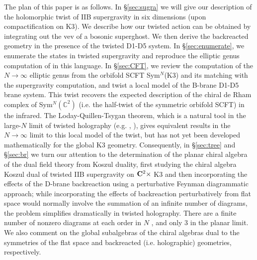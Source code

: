 \documentclass[11pt]{amsart}
\begin{document}
The plan of this paper is as follows. In \S \ref{sec:sugra} we will give our description of the holomorphic twist of IIB supergravity in six dimensions (upon compactification on K3). We describe how our twisted action can be obtained by integrating out the vev of a bosonic superghost. We then derive the backreacted geometry in the presence of the twisted D1-D5 system. In \S \ref{sec:enumerate}, we enumerate the states in twisted supergravity and reproduce the elliptic genus computation of \cite{deBoerSUGRA, deBoerEG} in this language. In \S \ref{sec:CFT}, we review the computation of the $N \rightarrow \infty$ elliptic genus from the orbifold SCFT Sym$^N$(K3) and its matching with the supergravity computation, and twist a local model of the B-brane D1-D5 brane system. This twist recovers the expected description of the chiral de Rham complex of Sym$^N(\mathbb{C}^2)$ (i.e. the half-twist of the symmetric orbifold SCFT) in the infrared. The Loday-Quillen-Tsygan theorem, which is a natural tool in the large-$N$ limit of twisted holography (e.g. \cite{Zeng:2023lox}, \cite{ginot2022large}), gives equivalent results in the $N \rightarrow \infty$ limit to this local model of the twist, but has not yet been developed mathematically for the global K3 geometry. Consequently, in \S \ref{sec:tree} and \S \ref{sec:br} we turn our attention to the determination of the planar chiral algebra of the dual field theory from Koszul duality, first studying the chiral algebra Koszul dual of twisted IIB supergravity on $\mathbf{C}^2 \times$ K3 and then incorporating the effects of the D-brane backreaction using a perturbative Feynman diagrammatic approach; while incorporating the effects of backreaction perturbatively from flat space would normally involve the summation of an infinite number of diagrams, the problem simplifies dramatically in twisted holography. There are a finite number of nonzero diagrams at each order in $N$ \cite{CP}, and only 3 in the planar limit. We also comment on the global subalgebras of the chiral algebras dual to the symmetries of the flat space and backreacted (i.e. holographic) geometries, respectively.

















\end{document}
